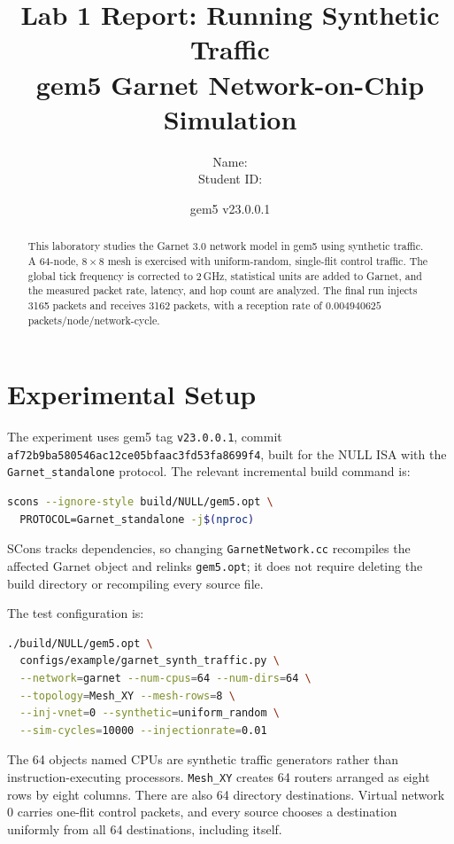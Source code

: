 \documentclass[11pt,a4paper]{article}
\title{\textbf{Lab 1 Report: Running Synthetic Traffic}\\[0.4em]
       \large gem5 Garnet Network-on-Chip Simulation}
\author{\begin{tabular}{rl}
          Name: & \rule{7cm}{0.4pt} \\
          Student ID: & \rule{7cm}{0.4pt}
        \end{tabular}}
\date{gem5 v23.0.0.1}
\newcommand{\code}[1]{\texttt{#1}}
\begin{document}
\maketitle

\begin{abstract}
This laboratory studies the Garnet 3.0 network model in gem5 using synthetic
traffic. A 64-node, $8\times8$ mesh is exercised with uniform-random,
single-flit control traffic. The global tick frequency is corrected to
2\,GHz, statistical units are added to Garnet, and the measured packet rate,
latency, and hop count are analyzed. The final run injects 3165 packets and
receives 3162 packets, with a reception rate of
$0.004940625$ packets/node/network-cycle.
\end{abstract}

\tableofcontents
\newpage

\section{Experimental Setup}

The experiment uses gem5 tag \code{v23.0.0.1}, commit
\code{af72b9ba580546ac12ce05bfaac3fd53fa8699f4}, built for the NULL ISA with
the \code{Garnet\_standalone} protocol. The relevant incremental build command
is:

\begin{lstlisting}[language=bash]
scons --ignore-style build/NULL/gem5.opt \
  PROTOCOL=Garnet_standalone -j$(nproc)
\end{lstlisting}

SCons tracks dependencies, so changing \code{GarnetNetwork.cc} recompiles the
affected Garnet object and relinks \code{gem5.opt}; it does not require deleting
the build directory or recompiling every source file.

The test configuration is:

\begin{lstlisting}[language=bash]
./build/NULL/gem5.opt \
  configs/example/garnet_synth_traffic.py \
  --network=garnet --num-cpus=64 --num-dirs=64 \
  --topology=Mesh_XY --mesh-rows=8 \
  --inj-vnet=0 --synthetic=uniform_random \
  --sim-cycles=10000 --injectionrate=0.01
\end{lstlisting}

The 64 objects named CPUs are synthetic traffic generators rather than
instruction-executing processors. \code{Mesh\_XY} creates 64 routers arranged
as eight rows by eight columns. There are also 64 directory destinations.
Virtual network 0 carries one-flit control packets, and every source chooses a
destination uniformly from all 64 destinations, including itself.
\end{document}
